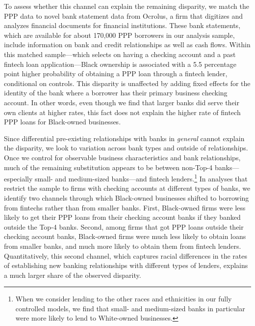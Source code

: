 \documentclass[11pt]{article}
\begin{document}
To assess whether this channel can explain the remaining disparity, we match the PPP data to novel bank statement data from Ocrolus, a firm that digitizes and analyzes financial documents for financial institutions. These bank statements, which are available for about 170,000 PPP borrowers in our analysis sample, include information on bank and credit relationships as well as cash flows. Within this matched sample---which selects on having a checking account and a past fintech loan application---Black ownership is associated with a 5.5 percentage point higher probability of obtaining a PPP loan through a fintech lender, conditional on controls. This disparity is unaffected by adding fixed effects for the identity of the bank where a borrower has their primary business checking account. In other words, even though we find that larger banks did serve their own clients at higher rates, this fact does not explain the higher rate of fintech PPP loans for Black-owned businesses.

Since differential pre-existing relationships with banks in \textit{general} cannot explain the disparity, we look to variation across bank types and outside of relationships. Once we control for observable business characteristics and bank relationships, much of the remaining substitution appears to be between non-Top-4 banks---especially small- and medium-sized banks---and fintech lenders.\footnote{When we consider lending to the other races and ethnicities in our fully controlled models, we find that small- and medium-sized banks in particular were more likely to lend to White-owned businesses.}  In analyses that restrict the sample to firms with checking accounts at different types of banks, we identify two channels through which Black-owned businesses shifted to borrowing from fintechs rather than from smaller banks. First, Black-owned firms were less likely to get their PPP loans from their checking account banks if they banked outside the Top-4 banks. Second, among firms that got PPP loans outside their checking account banks, Black-owned firms were much less likely to obtain loans from smaller banks, and much more likely to obtain them from fintech lenders. Quantitatively, this second channel, which captures racial differences in the rates of establishing new banking relationships with different types of lenders, explains a much larger share of the observed disparity.
\end{document}
